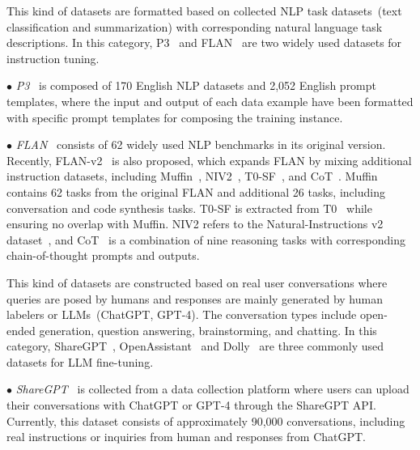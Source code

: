 {{{{  %
{This kind of datasets are formatted based on collected NLP task datasets~(\eg text classification and summarization) with corresponding natural language task descriptions. In this category, P3~\cite{Sanh-2022-ICLR-P3} and FLAN~\cite{Wei-ICLR-2022-Finetuned, Longpre-2023-arxiv-Flan_v2} are two widely used datasets for instruction tuning. }

$\bullet$ \emph{P3}~\cite{Sanh-2022-ICLR-P3} is composed of 170 English NLP datasets and 2,052 English prompt templates, where the input and output of each data example have been formatted with specific prompt templates for composing the training instance.

$\bullet$ \emph{FLAN}{~\cite{Wei-ICLR-2022-Finetuned} consists of 62 widely used NLP benchmarks in its original version. Recently, FLAN-v2~\cite{Longpre-2023-arxiv-Flan_v2} is also proposed, which expands FLAN by mixing additional instruction datasets, including  Muffin~\cite{Wei-ICLR-2022-Finetuned}, NIV2~\cite{Wang-EMNLP-2022-Super}, T0-SF~\cite{Sanh-ICLR-2022-Multitask}, and CoT~\cite{Cobbe-arxiv-2021-Training, Geva-tacl-2021-Did, Camburu-2020-ACL-Make}. Muffin contains 62 tasks from the original FLAN and additional 26 tasks, including conversation and code synthesis tasks. T0-SF is extracted from T0~\cite{Sanh-ICLR-2022-Multitask} while ensuring no overlap with Muffin. NIV2 refers to the Natural-Instructions v2 dataset~\cite{Wang-EMNLP-2022-Super}, and CoT~\cite{Cobbe-arxiv-2021-Training, Geva-tacl-2021-Did, Camburu-2020-ACL-Make} is a combination of nine reasoning tasks with corresponding chain-of-thought prompts and outputs. }

{This kind of datasets are constructed based on real user conversations where queries are posed by humans and responses are mainly  generated by human labelers or LLMs~(\eg ChatGPT, GPT-4). The conversation types include open-ended generation, question answering, brainstorming, and chatting. In this category,  ShareGPT~\cite{ShareGPT}, OpenAssistant~\cite{kopf-arxiv-2023-openassistant} and Dolly~\cite{Conover-2023-arxiv-Dolly} are three commonly used datasets for LLM fine-tuning.}

$\bullet$ \emph{ShareGPT}{~\cite{ShareGPT} is collected from a data collection platform where users can upload their conversations with ChatGPT or GPT-4 through the ShareGPT API. Currently, this dataset consists of approximately 90,000 conversations, including real instructions or inquiries from human and responses from ChatGPT.} 

}}}}
